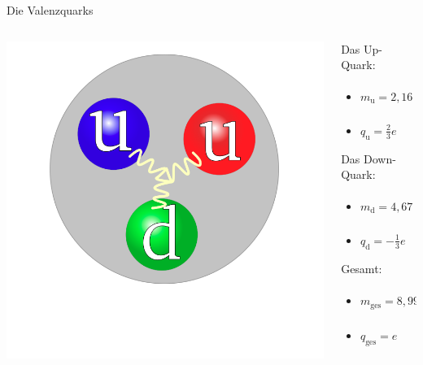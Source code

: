 \documentclass[aspectratio=1610, 9pt]{beamer}
\begin{document}
\begin{frame}{Die Valenzquarks}
  \begin{columns}
    \begin{column}{0.40\textwidth}
      \includegraphics[width = \textwidth]{images/Proton.png}
    \end{column}

    \begin{column}{0.45\textwidth}
      Das Up-Quark:
      \begin{itemize}
        \item{ $ m_\text{u} = 2,16 \substack{+0.49 \\ -0.26} \,\mathrm{MeV} $  }
        \item{ $ q_\text{u} = \frac{2}{3} e$ }
      \end{itemize}

      Das Down-Quark:
      \begin{itemize}
        \item{ $ m_\text{d} = 4,67 \substack{+0.48 \\ -0.17} \,\mathrm{MeV} $  }
        \item{ $q_\text{d} = - \frac{1}{3} e$ }
      \end{itemize}

      Gesamt:
      \begin{itemize}
        \item{ $ m_\text{ges} = 8,99 \substack{+1,09 \\ -0.55} \,\mathrm{MeV} $  }
        \item{ $ q_\text{ges} =  e$ }
      \end{itemize}

    \end{column}
  \end{columns}
\end{frame}
\end{document}
